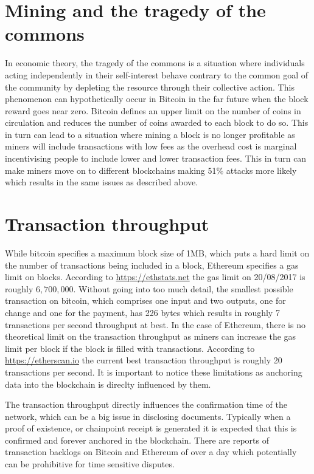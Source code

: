 \documentclass[12pt,msc,a4paper,oneside]{ucl_thesis}
\begin{document}
\section{Mining and the tragedy of the commons}
In economic theory, the tragedy of the commons \cite{wikipedia:tragedy_of_the_commons} is a situation where individuals acting independently in their self-interest behave contrary to the common goal of the community by depleting the resource through their collective action. This phenomenon can hypothetically occur in Bitcoin in the far future when the block reward goes near zero. Bitcoin defines an upper limit on the number of coins in circulation and reduces the number of coins awarded to each block to do so. This in turn can lead to a situation where mining a block is no longer profitable as miners will include transactions with low fees as the overhead cost is marginal incentivising people to include lower and lower transaction fees. This in turn can make miners move on to different blockchains making 51\% attacks more likely which results in the same issues as described above.

\section{Transaction throughput}
While bitcoin specifies a maximum block size of 1MB, which puts a hard limit on the number of transactions being included in a block, Ethereum specifies a gas limit on blocks. According to \url{https://ethstats.net} the gas limit on 20/08/2017 is roughly $6,700,000$. Without going into too much detail, the smallest possible transaction on bitcoin, which comprises one input and two outputs, one for change and one for the payment, has 226 bytes which results in roughly 7 transactions per second throughput at best. In the case of Ethereum, there is no theoretical limit on the transaction throughput as miners can increase the gas limit per block if the block is filled with transactions. According to \url{https://etherscan.io} the current best transaction throughput is roughly 20 transactions per second. It is important to notice these limitations as anchoring data into the blockchain is direclty influenced by them.

The transaction throughput directly influences the confirmation time of the network, which can be a big issue in disclosing documents. Typically when a proof of existence, or chainpoint receipt is generated it is expected that this is confirmed and forever anchored in the blockchain. There are reports of transaction backlogs on Bitcoin and Ethereum of over a day which potentially can be prohibitive for time sensitive disputes.
\end{document}
